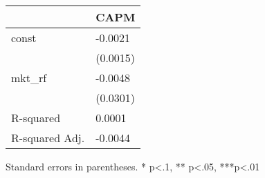 \begin{table}
\caption{}
\label{}
\begin{center}
\begin{tabular}{ll}
\hline
               & CAPM      \\
\hline
const          & -0.0021   \\
               & (0.0015)  \\
mkt\_rf        & -0.0048   \\
               & (0.0301)  \\
R-squared      & 0.0001    \\
R-squared Adj. & -0.0044   \\
\hline
\end{tabular}
\end{center}
\end{table}
\bigskip
Standard errors in parentheses. \newline 
* p<.1, ** p<.05, ***p<.01